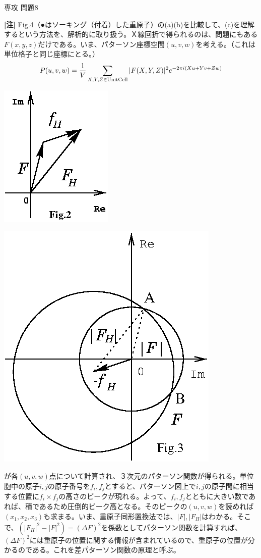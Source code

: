 \documentclass[fleqn]{jbook}
\begin{document}
\begin{answer}{専攻 問題8}{}
\begin{subanswers}
\begin{subsubanswers}
{{\bf{[注]}} Fig.4（●はソーキング（付着）した重原子）の(a)(b)を比較して、(c)を理解するという方法を、解析的に取り扱う。Ｘ線回折で得られるのは、問題にもある$F(x,y,z)$だけである。いま、パターソン座標空間$(u,v,w)$を考える。（これは単位格子と同じ座標にとる。）
\[ P(u,v,w)=\frac{1}{V}\sum_{X,Y,Z \in \rm{Unit Cell}}|F(X,Y,Z)|^2 e^{-2\pi i(Xu+Yv+Zw)}\]
}\parbox[t]{60mm}{
\begin{center}
\includegraphics[clip]{1993phy8-2.eps}

\includegraphics[clip]{1993phy8-3.eps}
\end{center}}

が各$(u,v,w)$点について計算され、３次元のパターソン関数が得られる。単位胞中の原子$i,j$の原子番号を$f_i,f_j$とすると、パターソン図上で$i,j$の原子間に相当する位置に$f_i\times f_j$の高さのピークが現れる。よって、$f_i,f_j$とともに大きい数であれば、積であるため圧倒的ピーク高となる。そのピークの$(u,v,w)$を読めれば$(x_1,x_2,x_3)$も求まる。いま、重原子同形置換法では、$|F|,|F_H|$はわかる。そこで、$(|F_H|^2 -|F|^2)=(\Delta F)^2$を係数としてパターソン関数を計算すれば、$(\Delta F)^2$には重原子の位置に関する情報が含まれているので、重原子の位置が分かるのである。これを差パターソン関数の原理と呼ぶ。


\end{subsubanswers}
\end{subanswers}
\end{answer}
\end{document}
